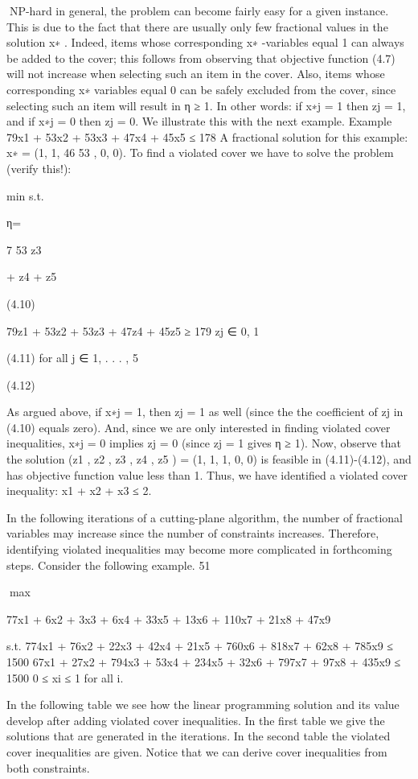 NP-hard in general, the problem can become fairly easy for a given instance. This is due to the fact
that there are usually only few fractional values in the solution x∗ . Indeed, items whose corresponding
x∗ -variables equal 1 can always be added to the cover; this follows from observing that objective function
(4.7) will not increase when selecting such an item in the cover. Also, items whose corresponding x∗ variables equal 0 can be safely excluded from the cover, since selecting such an item will result in η ≥ 1.
In other words: if x∗j = 1 then zj = 1, and if x∗j = 0 then zj = 0. We illustrate this with the next
example.
Example
79x1 + 53x2 + 53x3 + 47x4 + 45x5 ≤ 178
A fractional solution for this example: x∗ = (1, 1, 46
53 , 0, 0). To find a violated cover we have to solve the
problem (verify this!):

min
s.t.

η=

7
53 z3

+ z4 + z5

(4.10)

79z1 + 53z2 + 53z3 + 47z4 + 45z5 ≥ 179
zj ∈ {0, 1}

(4.11)
for all j ∈ {1, . . . , 5}

(4.12)

As argued above, if x∗j = 1, then zj = 1 as well (since the the coefficient of zj in (4.10) equals zero). And,
since we are only interested in finding violated cover inequalities, x∗j = 0 implies zj = 0 (since zj = 1
gives η ≥ 1). Now, observe that the solution (z1 , z2 , z3 , z4 , z5 ) = (1, 1, 1, 0, 0) is feasible in (4.11)-(4.12),
and has objective function value less than 1. Thus, we have identified a violated cover inequality:
x1 + x2 + x3 ≤ 2.

In the following iterations of a cutting-plane algorithm, the number of fractional variables may increase
since the number of constraints increases. Therefore, identifying violated inequalities may become more
complicated in forthcoming steps.
Consider the following example.
51

max

77x1 + 6x2 + 3x3 + 6x4 + 33x5 + 13x6 + 110x7 + 21x8 + 47x9

s.t. 774x1 + 76x2 + 22x3 + 42x4 + 21x5 + 760x6 + 818x7 + 62x8 + 785x9 ≤ 1500
67x1 + 27x2 + 794x3 + 53x4 + 234x5 + 32x6 + 797x7 + 97x8 + 435x9 ≤ 1500
0 ≤ xi ≤ 1 for all i.

In the following table we see how the linear programming solution and its value develop after adding
violated cover inequalities. In the first table we give the solutions that are generated in the iterations.
In the second table the violated cover inequalities are given. Notice that we can derive cover inequalities
from both constraints.

